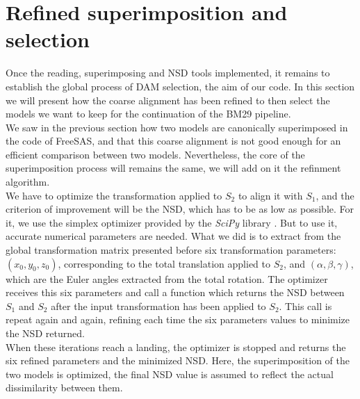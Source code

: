 \documentclass[a4paper, 11pt]{report}
\begin{document}
\section{Refined superimposition and selection}

Once the reading, superimposing and NSD tools implemented, it remains 
to establish the global process of DAM selection, the aim of our code. 
In this section we will present how the coarse alignment has been 
refined to then select the models we want to keep for the continuation 
of the BM29 pipeline.\\

We saw in the previous section how two models are canonically 
superimposed in the code of FreeSAS, and that this coarse alignment is 
not good enough for an efficient comparison between two models. 
Nevertheless, the core of the superimposition process will remains the 
same, we will add on it the refinment algorithm.\\
We have to optimize the transformation applied to $S_{2}$ to align it 
with $S_{1}$, and the criterion of improvement will be the NSD, which 
has to be as low as possible. 
For it, we use the simplex optimizer provided by the \textit{SciPy} 
library \cite{scipy}. 
But to use it, accurate numerical parameters are needed. 
What we did is to extract from the global transformation matrix 
presented before six transformation parameters: 
$(x_{0}, y_{0}, z_{0})$, 
corresponding to the total translation applied to $S_{2}$, and 
$(\alpha, \beta, \gamma)$, 
which are the Euler angles extracted from the total rotation. 
The optimizer receives this six parameters and call a function which 
returns the NSD between $S_{1}$ and $S_{2}$ after the input 
transformation has been applied to $S_{2}$. 
This call is repeat again and again, refining each time the six 
parameters values to minimize the NSD returned.\\
When these iterations reach a landing, the optimizer is stopped and 
returns the six refined parameters and the minimized NSD. 
Here, the superimposition of the two models is optimized, the final 
NSD value is assumed to reflect the actual dissimilarity between them.\\
\end{document}
